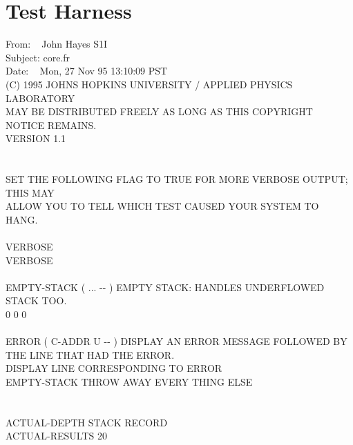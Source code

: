 \section{Test Harness} %

\begin{tt}
 From: ~ John Hayes S1I \\
 Subject: core.fr \\
 Date: ~ Mon, 27 Nov 95 13:10:09 PST \\
 (C) 1995 JOHNS HOPKINS UNIVERSITY / APPLIED PHYSICS LABORATORY\\
 MAY BE DISTRIBUTED FREELY AS LONG AS THIS COPYRIGHT NOTICE REMAINS.\\
 VERSION 1.1\\
 \\
\\
 SET THE FOLLOWING FLAG TO TRUE FOR MORE VERBOSE OUTPUT; THIS MAY \\
 ALLOW YOU TO TELL WHICH TEST CAUSED YOUR SYSTEM TO HANG. \\
\\
 VERBOSE \\
\tab[1.2]  VERBOSE \word{!} \\
\\
\word{:} EMPTY-STACK \tab {} ( ... -{}- ) EMPTY STACK: HANDLES UNDERFLOWED STACK TOO. \\
\tab {}       0  0   0      \word{;} \\
\\
\word{:} ERROR \tab {} ( C-ADDR U -{}- ) DISPLAY AN ERROR MESSAGE FOLLOWED BY\\
\tab[5.2]  THE LINE THAT HAD THE ERROR.\\
\tab {}   		\tab[3]  DISPLAY LINE CORRESPONDING TO ERROR\\
\tab EMPTY-STACK											\tab[7.8]  THROW AWAY EVERY THING ELSE\\
\word{;} \\
\\
 ACTUAL-DEPTH \tab[3]  STACK RECORD\\
\tab[.7]  ACTUAL-RESULTS 20   \\

\end{tt}

